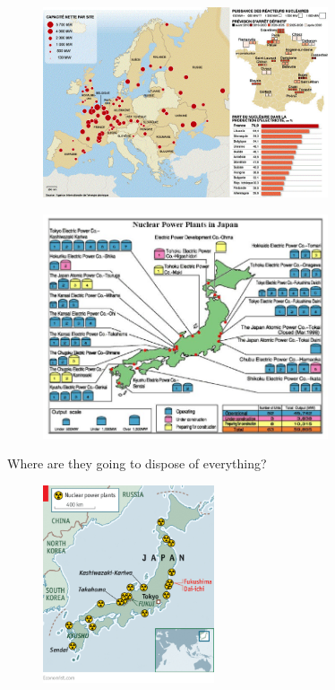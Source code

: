 \documentclass[aspectratio=1610,pdftex,dvipsnames,compress,xcolor={dvipsnames}]{beamer}
\begin{document}
\addtocounter{framenumber}{-1} 
\begin{frame}{}
    \begin{figure}
        \centering
        \includegraphics[width=0.75\textwidth]{europe.jpg}
    \end{figure}
\end{frame}


\begin{frame}{}
    \begin{figure}
        \centering
        \includegraphics[width=0.75\textwidth]{japan.jpg}
    \end{figure}
\end{frame}


\begin{frame}{Where are they going to dispose of everything?}
    \begin{figure}
        \centering
        \includegraphics[width=0.45\textwidth]{japan2.jpg}
    \end{figure}
\end{frame}
\end{document}
